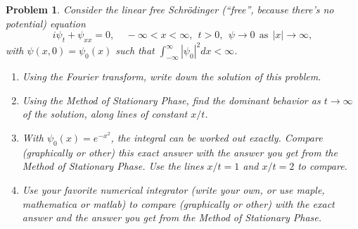 \documentclass[12pt]{report}
\newtheorem{problem}{Problem}
\begin{document}
\newpage



\begin{problem}
    Consider the linear free Schr\"odinger (``free'', because there's no
potential) equation
$$
i \psi_t+\psi_{xx}=0, ~~~~~-\infty<x<\infty,~~t>0, ~~\psi\rightarrow 0
~~\mbox{as}~~ |x|\rightarrow \infty,
$$
with $\psi(x,0)=\psi_0(x)$ such that $\int_{-\infty}^\infty|\psi_0|^2
dx<\infty$.

\begin{enumerate}

\item Using the Fourier transform, write down the solution of this problem.

\item Using the Method of Stationary Phase, find the dominant behavior as
$t\rightarrow \infty$ of the
solution, along lines of constant $x/t$.

\item With $\psi_0(x)=e^{-x^2}$, the integral can be worked out exactly.
Compare (graphically or other) this exact answer with the answer you get from
the Method of Stationary Phase. Use the lines $x/t=1$ and $x/t=2$ to compare.

\item Use your favorite numerical integrator (write your own, or use maple,
mathematica or matlab) to compare (graphically or other) with the exact answer
and the answer you get from the Method of Stationary Phase.

\end{enumerate}
\end{problem}
\end{document}
